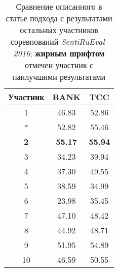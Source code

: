 \begin{table}[htp!]
\centering
\caption{Сравнение описанного в статье подхода с результатами остальных
    участников соревнований {\it SentiRuEval-2016}; {\bf жирным шрифтом}
    отмечен участник с наилучшими результатами}
\label{table:comparison}
\begin{tabular}{ccc}
\hline
Участник   & BANK           & TCC             \\ \hline
1          & 46.83          & 52.86           \\
*          & 52.82          & 55.46           \\
\textbf{2} & \textbf{55.17} & \textbf{55.94}  \\
3          & 34.23          & 39.94           \\
4          & 37.30          & 49.55           \\
5          & 38.59          & 34.99           \\
6          & 23.98          & 35.45           \\
7          & 47.10          & 48.42           \\
8          & 44.92          & 48.71           \\
9          & 51.95          & 54.89           \\
10         & 46.59          & 50.55           \\ \hline
\end{tabular}
\end{table}

